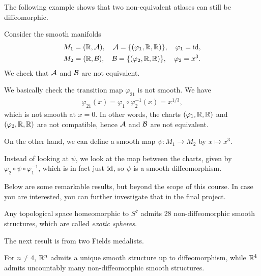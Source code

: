 The following example shows that two non-equivalent atlases can still be diffeomorphic.
\begin{example}
  Consider the smooth manifolds \begin{gather*}
    M_1 = (\mathbb{R},\mathcal{A}),\quad \mathcal{A} = \{(\varphi_1,\mathbb{R},\mathbb{R})\},\quad \varphi_1 = \mathrm{id}, \\
    M_2 = (\mathbb{R},\mathcal{B}),\quad \mathcal{B} = \{(\varphi_2,\mathbb{R},\mathbb{R})\},\quad \varphi_2 = x^3.
  \end{gather*}
  We check that \(\mathcal{A}\) and \(\mathcal{B}\) are not equivalent.
  \begin{roof}
    We basically check the transition map \(\varphi_{21}\) is not smooth. We have \begin{align*}
      \varphi_{21}(x) = \varphi_1\circ\varphi_2^{-1}(x) = x^{1/3},
    \end{align*} which is not smooth at \(x=0\). In other words, the charts \((\varphi_1,\mathbb{R},\mathbb{R})\) and \((\varphi_2,\mathbb{R},\mathbb{R})\) are not compatible, hence \(\mathcal{A}\) and \(\mathcal{B}\) are not equivalent.
  \end{roof}

  On the other hand, we can define a smooth map \(\psi:M_1\to M_2\) by \(x \mapsto x^3\).
  \begin{roof}
    \begin{center}
      
    \end{center}
    Instead of looking at \(\psi\), we look at the map between the charts, given by \(\varphi_2\circ\psi\circ\varphi_1^{-1}\), which is in fact just \(\mathrm{id}\), so \(\psi\) is a smooth diffeomorphism.
  \end{roof}
\end{example}

Below are some remarkable results, but beyond the scope of this course. In case you are interested, you can further investigate that in the final project.
\begin{proposition}
  Any topological space homeomorphic to \(S^7\) admits 28 non-diffeomorphic smooth structures, which are called \emph{exotic spheres}.
\end{proposition}

The next result is from two Fields medalists.
\begin{proposition}
  For \(n\neq 4\), \(\mathbb{R}^n\) admits a unique smooth structure up to diffeomorphism, while \(\mathbb{R}^4\) admits uncountably many non-diffeomorphic smooth structures.
\end{proposition}

